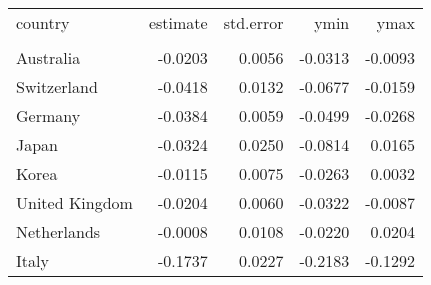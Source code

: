 \begin{tabular}{lrrrr}
   \toprule 
 
country & estimate & std.error & ymin & ymax \\ 

\cmidrule(lr){1-5} 
 
\\[-1.8ex]  
 
Australia & -0.0203 & 0.0056 & -0.0313 & -0.0093 \\ 
  Switzerland & -0.0418 & 0.0132 & -0.0677 & -0.0159 \\ 
  Germany & -0.0384 & 0.0059 & -0.0499 & -0.0268 \\ 
  Japan & -0.0324 & 0.0250 & -0.0814 & 0.0165 \\ 
  Korea & -0.0115 & 0.0075 & -0.0263 & 0.0032 \\ 
  United Kingdom & -0.0204 & 0.0060 & -0.0322 & -0.0087 \\ 
  Netherlands & -0.0008 & 0.0108 & -0.0220 & 0.0204 \\ 
  Italy & -0.1737 & 0.0227 & -0.2183 & -0.1292 \\ 
   \bottomrule  
\end{tabular}
